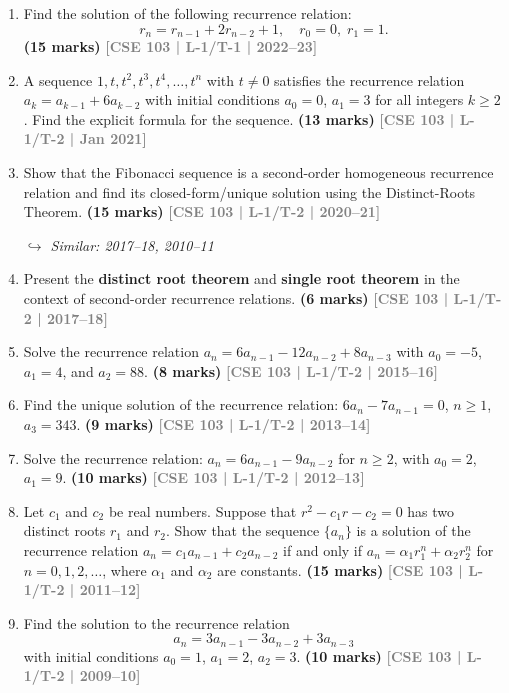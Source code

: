 \documentclass[12pt,a3paper]{article}
\newcommand{\yr}[1]{\hfill\textcolor{gray}{\small\textbf{[#1]}}}
\newcommand{\mk}[1]{\textcolor{orange!70!black}{\small\textbf{(#1 marks)}}}
\newcommand{\variant}[1]{\par\vspace{1pt}\textcolor{blue!50!black}%
  {\footnotesize\textit{$\hookrightarrow$ Similar: #1}}}
\begin{document}
\begin{enumerate}

\item Find the solution of the following recurrence relation:
\[
  r_n = r_{n-1} + 2r_{n-2} + 1, \quad r_0 = 0,\; r_1 = 1.
\]
\mk{15} \yr{CSE 103 | L-1/T-1 | 2022--23}

\item A sequence $1, t, t^2, t^3, t^4, \ldots, t^n$ with $t \neq 0$ satisfies the recurrence relation $a_k = a_{k-1} + 6a_{k-2}$ with initial conditions $a_0 = 0$, $a_1 = 3$ for all integers $k \geq 2$. Find the explicit formula for the sequence.
\mk{13} \yr{CSE 103 | L-1/T-2 | Jan 2021}

\item Show that the Fibonacci sequence is a second-order homogeneous recurrence relation and find its closed-form/unique solution using the Distinct-Roots Theorem.
\mk{15} \yr{CSE 103 | L-1/T-2 | 2020--21} \variant{2017--18, 2010--11}

\item Present the \textbf{distinct root theorem} and \textbf{single root theorem} in the context of second-order recurrence relations.
\mk{6} \yr{CSE 103 | L-1/T-2 | 2017--18}

\item Solve the recurrence relation $a_n = 6a_{n-1} - 12a_{n-2} + 8a_{n-3}$ with $a_0 = -5$, $a_1 = 4$, and $a_2 = 88$.
\mk{8} \yr{CSE 103 | L-1/T-2 | 2015--16}

\item Find the unique solution of the recurrence relation: $6a_n - 7a_{n-1} = 0$, $n \geq 1$, $a_3 = 343$.
\mk{9} \yr{CSE 103 | L-1/T-2 | 2013--14}  

\item Solve the recurrence relation: $a_n = 6a_{n-1} - 9a_{n-2}$ for $n \geq 2$, with $a_0 = 2$, $a_1 = 9$.
\mk{10} \yr{CSE 103 | L-1/T-2 | 2012--13}

\item Let $c_1$ and $c_2$ be real numbers. Suppose that $r^2 - c_1 r - c_2 = 0$ has two distinct roots $r_1$ and $r_2$. Show that the sequence $\{a_n\}$ is a solution of the recurrence relation $a_n = c_1 a_{n-1} + c_2 a_{n-2}$ if and only if $a_n = \alpha_1 r_1^n + \alpha_2 r_2^n$ for $n = 0, 1, 2, \ldots$, where $\alpha_1$ and $\alpha_2$ are constants.
\mk{15} \yr{CSE 103 | L-1/T-2 | 2011--12}

\item Find the solution to the recurrence relation
\[
  a_n = 3a_{n-1} - 3a_{n-2} + 3a_{n-3}
\]
with initial conditions $a_0 = 1$, $a_1 = 2$, $a_2 = 3$.
\mk{10} \yr{CSE 103 | L-1/T-2 | 2009--10}

\end{enumerate}
\end{document}
